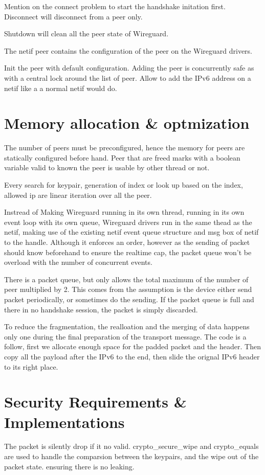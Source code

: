   Mention on the connect problem to start the handshake initation first. Disconnect will
  disconnect from a peer only. 

  Shutdown will clean all the peer state of Wireguard. 
  
  The netif peer contains the configuration of the peer on the Wireguard drivers.

  Init the peer with default configuration. Adding the peer is concurrently safe as with a 
  central lock around the list of peer. Allow
  to add the IPv6 address on a netif like a a normal netif would do.
\section{Memory allocation \& optmization}
  The number of peers must be preconfigured, hence the memory for peers are statically configured
  before hand. Peer that are freed marks with a boolean variable valid to known
  the peer is usable by other thread or not.

  Every search for keypair, generation of index or look up based on the index, allowed ip
  are linear iteration over all the peer.

  Instread of Making Wireguard running in its own thread, running in its own event loop
  with its own queue, Wireguard drivers run in the same thead as the netif, making 
  use of the existing netif event queue structure and msg box of netif to the handle.
  Although it enforces an order, however as the sending of packet should know beforehand
  to ensure the realtime cap, the packet queue won't be overload with the number of concurrent
  events.

  There is a packet queue, but only allows the total maximum of the number of peer multiplied by 2.
  This comes from the assumption is the device either send packet periodically, or sometimes
  do the sending. If the packet queue is full and there in no handshake session, the packet 
  is simply discarded.

  To reduce the fragmentation, the realloation and the merging of data happens only one during the final preparation
  of the transport message. The code is a follow, first we allocate enough space for the padded
  packet and the header. Then copy all the payload after the IPv6 to the end, then slide
  the orignal IPv6 header to its right place.

\section{Security Requirements \& Implementations}
  The packet is silently drop if it no valid. crypto{\_}secure{\_}wipe and crypto{\_}equals are used to
  handle the comparsion between the keypairs, and the wipe out of the packet state. ensuring
  there is no leaking.
  

